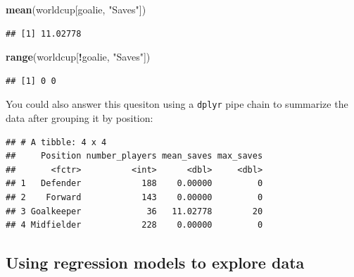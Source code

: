 \documentclass[]{book}
\makeatletter
\newenvironment{Shaded}{\begin{snugshade}}{\end{snugshade}}
\newcommand{\KeywordTok}[1]{\textcolor[rgb]{0.13,0.29,0.53}{\textbf{#1}}}
\newcommand{\DataTypeTok}[1]{\textcolor[rgb]{0.13,0.29,0.53}{#1}}
\newcommand{\StringTok}[1]{\textcolor[rgb]{0.31,0.60,0.02}{#1}}
\newcommand{\OperatorTok}[1]{\textcolor[rgb]{0.81,0.36,0.00}{\textbf{#1}}}
\newcommand{\NormalTok}[1]{#1}
\newenvironment{kframe}{%
\medskip{}
\setlength{\fboxsep}{.8em}
 \def\at@end@of@kframe{}%
 \ifinner\ifhmode%
  \def\at@end@of@kframe{\end{minipage}}%
  \begin{minipage}{\columnwidth}%
 \fi\fi%
 \def\FrameCommand##1{\hskip\@totalleftmargin \hskip-\fboxsep
 \colorbox{shadecolor}{##1}\hskip-\fboxsep
     \hskip-\linewidth \hskip-\@totalleftmargin \hskip\columnwidth}%
 \MakeFramed {\advance\hsize-\width
   \@totalleftmargin\z@ \linewidth\hsize
   \@setminipage}}%
 {\par\unskip\endMakeFramed%
 \at@end@of@kframe}
\renewenvironment{Shaded}{\begin{kframe}}{\end{kframe}}
\theoremstyle{definition}
\theoremstyle{definition}
\theoremstyle{definition}
\theoremstyle{remark}
\makeatother
\begin{document}
\begin{Shaded}
\begin{Highlighting}[]
\KeywordTok{mean}\NormalTok{(worldcup[goalie, }\StringTok{"Saves"}\NormalTok{])}
\end{Highlighting}
\end{Shaded}

\begin{verbatim}
## [1] 11.02778
\end{verbatim}

\begin{Shaded}
\begin{Highlighting}[]
\KeywordTok{range}\NormalTok{(worldcup[}\OperatorTok{!}\NormalTok{goalie, }\StringTok{"Saves"}\NormalTok{])}
\end{Highlighting}
\end{Shaded}

\begin{verbatim}
## [1] 0 0
\end{verbatim}

You could also answer this quesiton using a \texttt{dplyr} pipe chain to
summarize the data after grouping it by position:

\begin{Shaded}
\end{Shaded}

\begin{verbatim}
## # A tibble: 4 x 4
##     Position number_players mean_saves max_saves
##       <fctr>          <int>      <dbl>     <dbl>
## 1   Defender            188    0.00000         0
## 2    Forward            143    0.00000         0
## 3 Goalkeeper             36   11.02778        20
## 4 Midfielder            228    0.00000         0
\end{verbatim}

\subsection{Using regression models to explore
data}\label{using-regression-models-to-explore-data}
\end{document}
